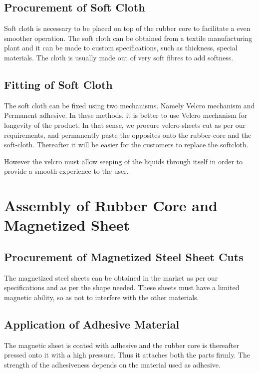 \documentclass[12pt,a4paper,oneside]{article}
\begin{document}
\subsection{Procurement of Soft Cloth}

Soft cloth is necessary to be placed on top of the rubber core to facilitate a even smoother operation. The soft cloth can be obtained from a textile manufacturing plant and it can be made to custom specifications, such as thickness, special materials. The cloth is usually made out of very soft fibres to add softness.


\subsection{Fitting of Soft Cloth}

The soft cloth can be fixed using two mechanisms. Namely Velcro mechanism and Permanent adhesive. In these methods, it is better to use Velcro mechanism for longevity of the product. In that sense, we procure velcro-sheets cut as per our requirements, and permanently paste the opposites onto the rubber-core and the soft-cloth. Thereafter it will be easier for the customers to replace the softcloth. 

However the velcro must allow seeping of the liquids through itself in order to provide a smooth experience to the user.


\newpage

\section{Assembly of Rubber Core and Magnetized Sheet}

\subsection{Procurement of Magnetized Steel Sheet Cuts}
The magnetized steel sheets can be obtained in the market as per our specifications and as per the shape needed. These sheets must have a limited magnetic ability, so as not to interfere with the other materials. 

\subsection{Application of Adhesive Material}
The magnetic sheet is coated with adhesive and the rubber core is thereafter pressed onto it with a high pressure. Thus it attaches both the parts firmly. The strength of the adhesiveness depends on the material used as adhesive. 
\end{document}
